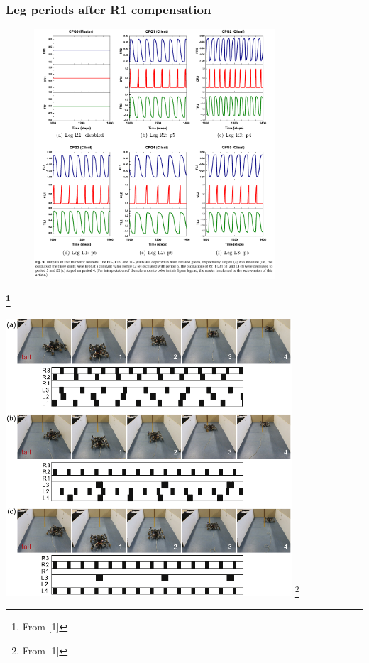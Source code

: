 \documentclass{beamer}
\begin{document}
\begin{frame}
\frametitle{Leg periods after R1 compensation}
\vspace*{-0.35cm}
\begin{figure}
\hspace*{-1.3cm}
\includegraphics[width=0.8\textwidth]{figs/periods-after-learning.pdf}
\end{figure}
\textbf{\footnote{From [1]}}
\end{frame}

\begin{frame}
    \vspace*{1cm}
    \hspace*{1.1cm}
    \includegraphics[width=0.8\textwidth]{figs/real-experiments.pdf}
    \footnote{From [1]}
\end{frame}
\end{document}
